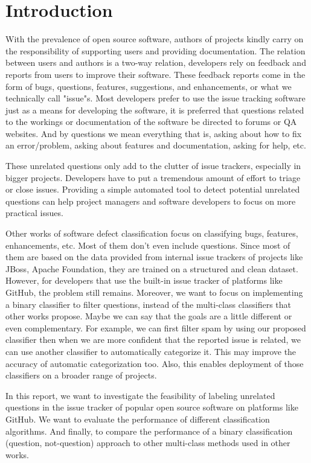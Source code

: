\documentclass[conference]{IEEEtran}
\begin{document}
\section{Introduction}
With the prevalence of open source software, authors of projects kindly carry on 
the responsibility of supporting users and providing documentation. The relation 
between users and authors is a two-way relation, developers rely on feedback and reports from 
users to improve their software. These feedback reports come in the form of bugs, questions, 
features, suggestions, and enhancements, or what we technically call "issue"s. Most developers
prefer to use the issue tracking software just as a means for developing the software, it is preferred 
that questions related to the workings or documentation of the software be directed to forums or QA
websites. And by questions we mean everything that is, asking about how to fix an error/problem, 
asking about features and documentation, asking for help, etc.

These unrelated questions only add to the clutter of issue trackers, especially in bigger projects.
Developers have to put a tremendous amount of effort to triage or close issues. Providing a 
simple automated tool to detect potential unrelated questions can help project managers 
and software developers to focus on more practical issues.

Other works of software defect classification focus on classifying bugs, 
features, enhancements, etc. Most of them don't even include questions. Since most of them are 
based on the data provided from internal issue trackers of projects like JBoss, Apache Foundation, they are
trained on a structured and clean dataset. However, for developers that use the built-in issue tracker
of platforms like GitHub, the problem still remains. Moreover, we want to focus on implementing 
a binary classifier to filter questions, instead of the multi-class classifiers that other 
works propose. Maybe we can say that the goals are a little different or even complementary. 
For example, we can first filter spam by using our proposed classifier then when 
we are more confident that the reported issue is related, we can use another classifier to 
automatically categorize it. This may improve the accuracy of automatic categorization too. Also, this 
enables deployment of those classifiers on a broader range of projects.

In this report, we want to investigate the feasibility of labeling unrelated questions
in the issue tracker of popular open source software on platforms like GitHub. We want to evaluate the performance
of different classification algorithms. And finally, to compare the performance of a binary classification 
(question, not-question) approach to other multi-class methods used in other works.
\end{document}
